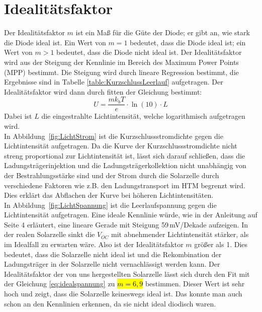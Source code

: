 \documentclass[12pt,a4paper,ngerman]{report}
\begin{document}
\section{Idealitätsfaktor}
Der Idealitätsfaktor $m$ ist ein Maß für die Güte der Diode; er gibt an, wie stark die Diode ideal ist. Ein Wert von $m=1$ bedeutet, dass die Diode ideal ist; ein Wert von $m>1$ bedeutet, dass die Diode nicht ideal ist. Der Idealitätsfaktor wird aus der Steigung der Kennlinie im Bereich des Maximum Power Points (MPP) bestimmt. Die Steigung wird durch lineare Regression bestimmt, die Ergebnisse sind in Tabelle \ref{table:KurzschlussLeerlauf} aufgetragen. Der Idealitätsfaktor wird dann durch fitten der Gleichung bestimmt: 
\begin{equation}\label{eq:idealspannung} U = \frac{m k_b T}{e} \cdot \ln(10) \cdot L \end{equation}
Dabei ist $L$ die eingestrahlte Lichtintensität, welche logarithmisch aufgetragen wird.\\
In Abbildung~\ref{fig:LichtStrom} ist die Kurzschlussstromdichte gegen die Lichtintensität aufgetragen. Da die Kurve der Kurzschlussstromdichte nicht streng proportional zur Lichtintensität ist, lässt sich darauf schließen, dass die Ladungsträgerinjektion und die Ladungsträgerkollektion nicht unabhängig von der Bestrahlungsstärke sind und der Strom durch die Solarzelle durch verschiedene Faktoren wie z.B. den Ladungstransport im HTM begrenzt wird. Dies erklärt das Abflachen der Kurve bei höheren Lichtintensitäten.\\
In Abbildung~\ref{fig:LichtSpannung} ist die Leerlaufspannung gegen die Lichtintensität aufgetragen. Eine ideale Kennlinie würde, wie in der Anleitung \cite{Anleitung} auf Seite 4 erläutert, eine lineare Gerade mit Steigung 59\,mV/Dekade aufzeigen. In der realen Solarzelle sinkt die $V_{OC}$ mit abnehmender Lichtintensität stärker, als im Idealfall zu erwarten wäre. Also ist der Idealitätsfaktor $m$ größer als 1. Dies bedeutet, dass die Solarzelle nicht ideal ist und die Rekombination der Ladungsträger in der Solarzelle nicht vernachlässigt werden kann. Der Idealitätsfaktor der von uns hergestellten Solarzelle lässt sich durch den Fit mit der Gleichung \ref{eq:idealspannung} zu \hl{$m=6,9$} bestimmen. Dieser Wert ist sehr hoch und zeigt, dass die Solarzelle keineswegs ideal ist. Das konnte man auch schon an den Kennlinien erkennen, da sie nicht ideal diodisch waren.\\
\end{document}
